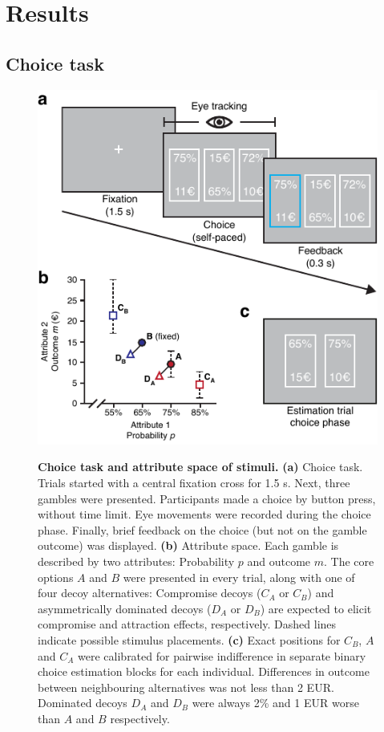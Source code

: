 \documentclass[11pt, a4paper]{article}
\begin{document}
\section*{Results}

\subsection*{Choice task}

\begin{figure}
\caption{\textbf{Choice task and attribute space of stimuli.} \textbf{(a)} Choice task. Trials started with a central fixation cross for 1.5 s. Next, three gambles were presented. Participants made a choice by button press, without time limit. Eye movements were recorded during the choice phase. Finally, brief feedback on the choice (but not on the gamble outcome) was displayed. \textbf{(b)} Attribute space. Each gamble is described by two attributes: Probability $p$ and outcome $m$. The core options $A$ and $B$ were presented in every trial, along with one of four decoy alternatives: Compromise decoys ($C_A$ or $C_B$) and asymmetrically dominated decoys ($D_A$ or $D_B$) are expected to elicit compromise and attraction effects, respectively. Dashed lines indicate possible stimulus placements. \textbf{(c)} Exact positions for $C_B$, $A$ and $C_A$ were calibrated for pairwise indifference in separate binary choice estimation blocks for each individual. Differences in outcome between neighbouring alternatives was not less than 2 EUR. Dominated decoys $D_A$ and $D_B$ were always 2\% and 1 EUR worse than $A$ and $B$ respectively.}
\includegraphics[scale=1]{../figures/1-task_stimuli.pdf}
\hspace{0.5cm}
\label{fig:task}
\end{figure}
\end{document}
